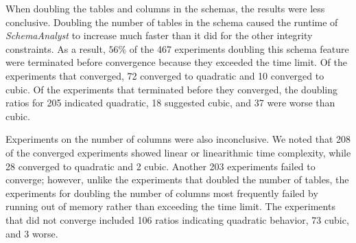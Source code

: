 When doubling the tables and columns in the schemas, the results were less conclusive. Doubling the number of tables in
the schema caused the runtime of \textit{SchemaAnalyst} to increase much faster than it did for the other integrity
constraints. As a result, $56\%$ of the 467 experiments doubling this schema feature were terminated before convergence
because they exceeded the time limit.  Of the experiments that converged, 72 converged to quadratic and 10 converged to
cubic.  Of the experiments that terminated before they converged, the doubling ratios for 205 indicated quadratic, 18
suggested cubic, and 37 were worse than cubic.

Experiments on the number of columns were also inconclusive.  We noted that 208 of the converged experiments showed
linear or linearithmic time complexity, while 28 converged to quadratic and 2 cubic.  Another 203 experiments failed to
converge; however, unlike the experiments that doubled the number of tables, the experiments for doubling the number of
columns most frequently failed by running out of memory rather than exceeding the time limit. The experiments that did not
converge included 106 ratios indicating quadratic behavior, 73 cubic, and 3 worse.


